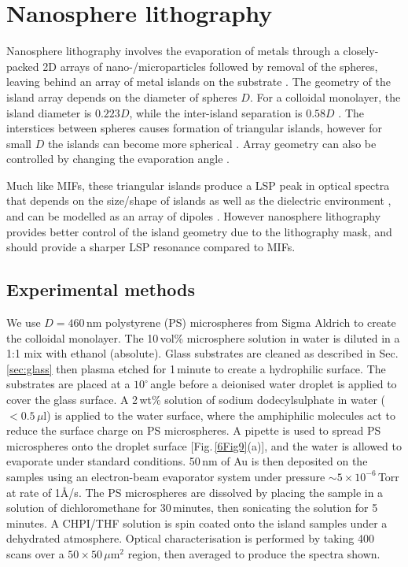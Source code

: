 \section{Nanosphere lithography}
Nanosphere lithography involves the evaporation of metals through a closely-packed 2D arrays of nano-/microparticles followed by removal of the spheres, leaving behind an array of metal islands on the substrate \cite{Haynes2001}. The geometry of the island array depends on the diameter of spheres $D$. For a colloidal monolayer, the island diameter is $0.223D$, while the inter-island separation is $0.58D$ \cite{Hulteen1995}. The interstices between spheres causes formation of triangular islands, however for small $D$ the islands can become more spherical \cite{Hulteen1999}. Array geometry can also be controlled by changing the evaporation angle \cite{Haynes2002}.

Much like MIFs, these triangular islands produce a LSP peak in optical spectra that depends on the size/shape of islands as well as the dielectric environment \cite{Jensen2000}, and can be modelled as an array of dipoles \cite{Malinsky2001, Jensen1999}. However nanosphere lithography provides better control of the island geometry due to the lithography mask, and should provide a sharper LSP resonance compared to MIFs.

\subsection{Experimental methods}
We use $D=460$\,nm polystyrene (PS) microspheres from Sigma Aldrich to create the colloidal monolayer. The 10\,vol\% microsphere solution in water is diluted in a 1:1 mix with ethanol (absolute). Glass substrates are cleaned as described in Sec.\,\ref{sec:glass} then plasma etched for 1\,minute to create a hydrophilic surface. The substrates are placed at a $10^{\circ}$\,angle before a deionised water droplet is applied to cover the glass surface. A 2\,wt\% solution of sodium dodecylsulphate in water ($<0.5\,\mu$l) is applied to the water surface, where the amphiphilic molecules act to reduce the surface charge on PS microspheres. A pipette is used to spread PS microspheres onto the droplet surface [Fig.\,\ref{6Fig9}(a)], and the water is allowed to evaporate under standard conditions. 50\,nm of Au is then deposited on the samples using an electron-beam evaporator system under pressure $\sim5\times10^{-6}$\,Torr at rate of 1\AA/s. The PS microspheres are dissolved by placing the sample in a solution of dichloromethane for 30\,minutes, then sonicating the solution for 5\,minutes. A CHPI/THF solution is spin coated onto the island samples under a dehydrated atmosphere. Optical characterisation is performed by taking 400 scans over a $50\times50\,\mu$m$^{2}$ region, then averaged to produce the spectra shown. 


